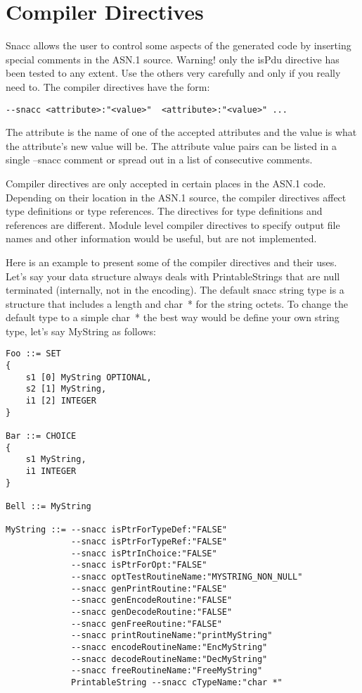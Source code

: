 \section{\label{compiler-dir-C-section}Compiler Directives}

Snacc allows the user to control some aspects of the generated code by
inserting special comments in the ASN.1 source.  Warning! only the
{\ASN isPdu} directive has been tested to any extent. Use the others
very carefully and only if you really need to.  The compiler
directives have the form:

\begin{verbatim}
--snacc <attribute>:"<value>"  <attribute>:"<value>" ...
\end{verbatim}

The {\ASN attribute} is the name of one of the accepted attributes and
the {\ASN value} is what the {\ASN attribute}'s new value will be.
The attribute value pairs can be listed in a single {\ASN --snacc}
comment or spread out in a list of consecutive comments.

Compiler directives are only accepted in certain places in the ASN.1
code.  Depending on their location in the ASN.1 source, the compiler
directives affect type definitions or type references.  The directives
for type definitions and references are different.  Module level
compiler directives to specify output file names and other information
would be useful, but are not implemented.

Here is an example to present some of the compiler directives and
their uses.  Let's say your data structure always deals with
{\C PrintableStrings} that are null terminated (internally, not in
the encoding).  The default snacc string type is a structure that
includes a length and {\C char~*} for the string octets.  To change
the default type to a simple {\C char~*} the best way would be define
your own string type, let's say {\ASN MyString} as follows:

\begin{small}
\begin{verbatim}
Foo ::= SET
{
    s1 [0] MyString OPTIONAL,
    s2 [1] MyString,
    i1 [2] INTEGER
}

Bar ::= CHOICE
{
    s1 MyString,
    i1 INTEGER
}

Bell ::= MyString

MyString ::= --snacc isPtrForTypeDef:"FALSE"
             --snacc isPtrForTypeRef:"FALSE"
             --snacc isPtrInChoice:"FALSE"
             --snacc isPtrForOpt:"FALSE"
             --snacc optTestRoutineName:"MYSTRING_NON_NULL"
             --snacc genPrintRoutine:"FALSE"
             --snacc genEncodeRoutine:"FALSE"
             --snacc genDecodeRoutine:"FALSE"
             --snacc genFreeRoutine:"FALSE"
             --snacc printRoutineName:"printMyString"
             --snacc encodeRoutineName:"EncMyString"
             --snacc decodeRoutineName:"DecMyString"
             --snacc freeRoutineName:"FreeMyString"
             PrintableString --snacc cTypeName:"char *"
\end{verbatim}
\end{small}

